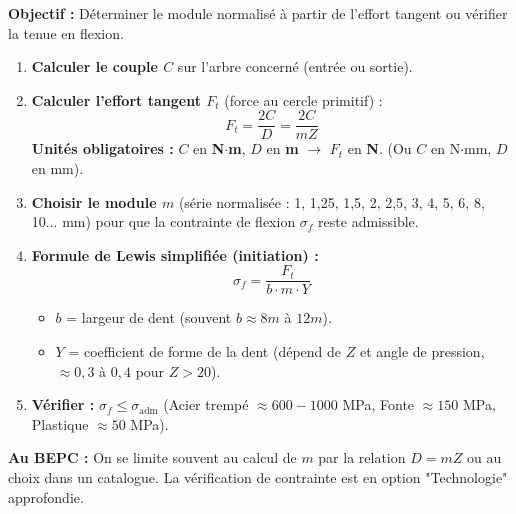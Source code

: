 \documentclass[11pt]{article}
\begin{document}
\begin{methode}
    \textbf{Objectif :} Déterminer le module normalisé à partir de l'effort tangent ou vérifier la tenue en flexion.
    \begin{enumerate}
        \item \textbf{Calculer le couple $C$} sur l'arbre concerné (entrée ou sortie).
        \item \textbf{Calculer l'effort tangent $F_t$} (force au cercle primitif) :
              \[
              F_t = \frac{2C}{D} = \frac{2C}{m Z}
              \]
              \textbf{Unités obligatoires :} $C$ en \textbf{N$\cdot$m}, $D$ en \textbf{m} $\rightarrow$ $F_t$ en \textbf{N}. (Ou $C$ en N$\cdot$mm, $D$ en mm).
        \item \textbf{Choisir le module $m$} (série normalisée : 1, 1,25, 1,5, 2, 2,5, 3, 4, 5, 6, 8, 10... mm) pour que la contrainte de flexion $\sigma_f$ reste admissible.
        \item \textbf{Formule de Lewis simplifiée (initiation) :}
              \[
              \sigma_f = \frac{F_t}{b \cdot m \cdot Y}
              \]
              \begin{itemize}
                  \item $b$ = largeur de dent (souvent $b \approx 8m$ à $12m$).
                  \item $Y$ = coefficient de forme de la dent (dépend de $Z$ et angle de pression, $\approx 0,3$ à $0,4$ pour $Z>20$).
              \end{itemize}
        \item \textbf{Vérifier :} $\sigma_f \le \sigma_{\text{adm}}$ (Acier trempé $\approx 600-1000$ MPa, Fonte $\approx 150$ MPa, Plastique $\approx 50$ MPa).
    \end{enumerate}
    \textbf{Au BEPC :} On se limite souvent au calcul de $m$ par la relation $D = mZ$ ou au choix dans un catalogue. La vérification de contrainte est en option "Technologie" approfondie.
\end{methode}
\end{document}
